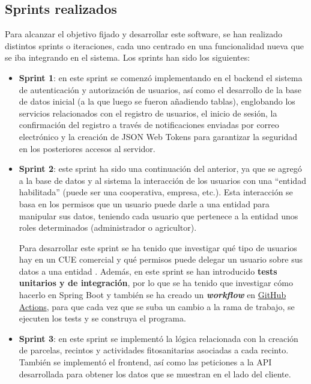 \subsection{Sprints realizados}

Para alcanzar el objetivo fijado y desarrollar este software, se han realizado distintos sprints o iteraciones, cada uno centrado en
una funcionalidad nueva que se iba integrando en el sistema. Los sprints han sido los siguientes:

\begin{itemize}
    \item \textbf{Sprint 1}: en este sprint se comenzó implementando en el backend el sistema de autenticación y autorización
    de usuarios, así como el desarrollo de la base de datos inicial (a la que luego se fueron añadiendo tablas), englobando los
    servicios relacionados con el registro de usuarios, el inicio de sesión, la confirmación del registro a través de notificaciones enviadas
    por correo electrónico y la creación de JSON Web Tokens para garantizar la seguridad en los posteriores accesos al servidor.
    
    \item \textbf{Sprint 2}: este sprint ha sido una continuación del anterior, ya que se agregó a la base de datos y al sistema
    la interacción de los usuarios con una ``entidad habilitada'' (puede ser una cooperativa, empresa, etc.). Esta interacción se basa
    en los permisos que un usuario puede darle a una entidad para manipular sus datos, teniendo cada usuario que pertenece a la entidad
    unos roles determinados (administrador o agricultor).

    Para desarrollar este sprint se ha tenido que investigar qué tipo de usuarios hay en un CUE comercial y qué permisos puede
    delegar un usuario sobre sus datos a una entidad \cite{anexosSIEX}. Además, en este sprint se han introducido \textbf{tests unitarios y de
    integración}, por lo que se ha tenido que investigar cómo hacerlo en Spring Boot y también se ha creado un \textbf{\textit{workflow}} en
    \hyperlink{githubActions}{GitHub Actions}, para que cada vez que se suba un cambio a la rama de trabajo, se ejecuten los tests y se construya el programa.

    \item \textbf{Sprint 3}: en este sprint se implementó la lógica relacionada con la creación de parcelas, recintos y actividades
    fitosanitarias asociadas a cada recinto. También se implementó el frontend, así como las peticiones a la API desarrollada
    para obtener los datos que se muestran en el lado del cliente.


\end{itemize}
